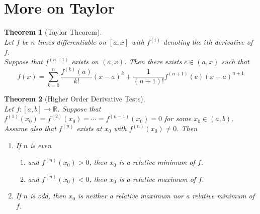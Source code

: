 \documentclass[12pt]{article}
\newtheorem{theorem}{Theorem}[section]
\theoremstyle{definition}
\begin{document}
\section{More on Taylor}
\begin{theorem}[Taylor Theorem]
\hfill\\\normalfont Let $f$ be $n$ times differentiable on $[a,x]$ with $f^{(i)}$ denoting the $i$th derivative of $f$.\\Suppose that $f^{(n+1)}$ exists on $(a,x)$. Then there exists $c\in(a,x)$ such that
\[
f(x)=\sum_{k=0}^n \frac{f^{(k)}(a)}{k!}(x-a)^k + \frac{1}{(n+1)!}f^{(n+1)}(c)(x-a)^{n+1}
\]
\end{theorem}
\begin{theorem}[Higher Order Derivative Tests]
\hfill\\\normalfont Let $f:[a,b]\to \mathbb{R}$. Suppose that $f^{(1)}(x_0)=f^{(2)}(x_0)=\cdots=f^{(n-1)}(x_0)=0$ for some $x_0\in(a,b)$.\\
Assume also that $f^{(n)}$ exists at $x_0$ with $f^{(n)}(x_0)\neq 0$. Then
\begin{enumerate}
	\item If $n$ is even
	\begin{enumerate}
		\item and $f^{(n)}(x_0)>0$, then $x_0$ is a relative minimum of $f$.
		\item and $f^{(n)}(x_0)<0$, then $x_0$ is a relative maximum of $f$.
	\end{enumerate}
	\item If $n$ is odd, then $x_0$ is neither a relative maximum nor a relative minimum of $f$.
\end{enumerate}
\end{theorem}
\clearpage
\end{document}
